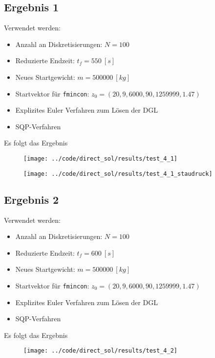 \subsection{Ergebnis 1}\label{kap:Versuch41}
Verwendet werden:
\begin{itemize}
\item Anzahl an Diskretisierungen: $N = 100$ 
\item Reduzierte Endzeit: $t_f = 550 \ [s]$
\item Neues Startgewicht: $m = 500000 \ [kg]$
\item Startvektor für \texttt{fmincon}: $z_0 = (20,9,6000,90,1259999,1.47)$
\item Explizites Euler Verfahren zum Lösen der DGL
%
\item SQP-Verfahren
\end{itemize}
Es folgt das Ergebnis
\begin{figure}[H]
\begin{center}
\texttt{[image: ../code/direct\_sol/results/test\_4\_1]}
 \label{img:test_4_1}
\end{center}
\end{figure}

\begin{figure}[H]
\begin{center}
\texttt{[image: ../code/direct\_sol/results/test\_4\_1\_staudruck]}
\label{img:test_4_1_staudruck}
\end{center}
\end{figure}




\subsection{Ergebnis 2}\label{kap:Versuch42}
Verwendet werden:
\begin{itemize}
\item Anzahl an Diskretisierungen: $N = 100$ 
\item Reduzierte Endzeit: $t_f = 600 \ [s]$
\item Neues Startgewicht: $m = 500000 \ [kg]$
\item Startvektor für \texttt{fmincon}: $z_0 = (20,9,6000,90,1259999,1.47)$
\item Explizites Euler Verfahren zum Lösen der DGL
%
\item SQP-Verfahren
\end{itemize}
Es folgt das Ergebnis
\begin{figure}[H]
\begin{center}
\texttt{[image: ../code/direct\_sol/results/test\_4\_2]}
 \label{img:test_4_2}
\end{center}
\end{figure}

